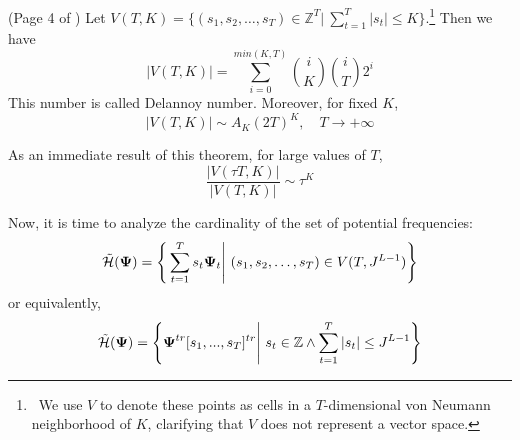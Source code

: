 \begin{theorem} \label{asymptotic_behavior}
    (Page 4 of \citep{kiselman2012asymptotic}) Let $V(T,K)=\big\{(s_1,s_2,\ldots,s_{T}) \in \mathbb{Z}^T \big|~ \sum_{t=1}^{T} |s_t|\leq K\big\}$.\footnote{~We use \( V \) to denote these points as cells in a \( T \)-dimensional von Neumann neighborhood of \( K \), clarifying that \( V \) does not represent a vector space.} Then we have
    \begin{equation}
        |V(T,K)|=\sum_{i=0}^{min(K,T)}\binom{i}{K}\binom{i}{T}2^i
    \end{equation}
    This number is called Delannoy number. Moreover, for fixed $K$,
    \begin{equation}
        |V(T,K)|\sim A_K(2T)^K,\quad T\rightarrow +\infty
    \end{equation}
\end{theorem}

As an immediate result of this theorem, for large values of $T$,
\begin{equation}
    \frac{|V(\tau T,K)|}{|V(T,K)|} \sim \tau^K
\end{equation}

Now, it is time to analyze the cardinality of the set of potential frequencies:
\begin{equation}
	\Tilde{\mathcal{H}}(\boldsymbol{\Psi})=\Bigg\{\sum_{t=1}^{T}s_t\boldsymbol{\Psi}_t \Bigg|~(s_1,s_2,\ldots,s_T) \in V(T,J^{L-1})\Bigg\}
\end{equation}
or equivalently,
\begin{equation}
	\Tilde{\mathcal{H}}(\boldsymbol{\Psi})=\Bigg\{\boldsymbol{\Psi}^{tr}[s_1,...,s_T]^{tr} \Bigg|~s_t \in \mathbb{Z}\wedge \sum_{t=1}^{T} |s_t|\leq J^{L-1}\Bigg\}
\end{equation}

